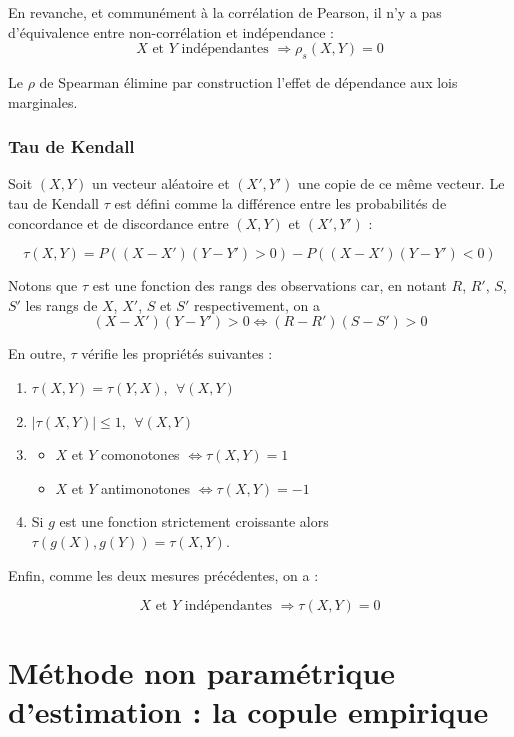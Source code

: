 En revanche, et communément à la corrélation de Pearson, il n’y a pas d’équivalence entre non-corrélation et indépendance :
$$
X \text{~et~} Y \text{~indépendantes~} \Longrightarrow \rho_s(X,Y) = 0
$$
	
Le $\rho$ de Spearman élimine par construction l’effet de dépendance aux lois marginales.


\subsubsection{Tau de Kendall}

Soit $(X,Y)$ un vecteur aléatoire et $(X',Y')$ une copie de ce même vecteur. Le tau de Kendall $\tau$ est défini
comme la différence  entre les probabilités de concordance et de discordance entre $(X,Y)$ et $(X',Y')$ :

$$
\tau(X,Y) = P\left( (X-X')(Y-Y') >0 \right) - P\left( (X-X')(Y-Y') <0 \right)
$$

Notons que $\tau$ est une fonction des rangs des observations car, en notant $R$, $R'$, $S$, $S'$ les rangs de $X$, $X'$, $S$ et $S'$ respectivement, on a 
$$
(X-X')(Y-Y') >0 \Longleftrightarrow (R-R')(S-S') >0 
$$

En outre, $\tau$ vérifie les propriétés suivantes :

\begin{enumerate}

\item $\tau(X,Y) = \tau(Y,X), ~~\forall (X,Y)$
\item $|\tau(X,Y)| \leq 1, ~~\forall (X,Y)$
\item 
\begin{itemize}
\item $X$ et $Y$ comonotones $\Longleftrightarrow \tau(X,Y)=1$
\item $X$ et $Y$ antimonotones $\Longleftrightarrow \tau(X,Y)=-1$
\end{itemize}
\item Si $g$ est une fonction strictement croissante alors $\tau(g(X),g(Y))=\tau(X,Y)$.
\end{enumerate}

Enfin, comme les deux mesures précédentes, on a :

$$
X \text{~et~} Y \text{~indépendantes~} \Longrightarrow \tau(X,Y) = 0
$$



\section{Méthode non paramétrique d'estimation : la copule empirique}
